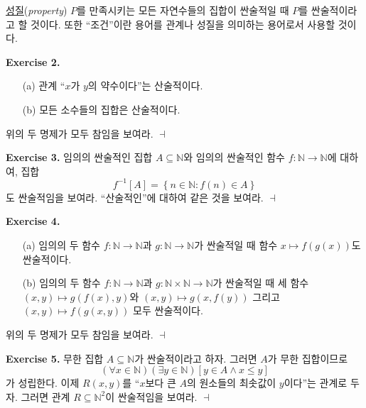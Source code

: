 \documentclass[12pt]{paper}
\newenvironment{context}[1][]{\noindent \textbf{{#1}.}}{\hfill $ \dashv $}
\begin{document}
  \underline{성질}(\textit{property}) $P$를 만족시키는 모든 자연수들의 집합이 싼술적일 때 $P$를 싼술적이라고 할 것이다.
  또한 ``조건''이란 용어를 관계나 성질을 의미하는 용어로서 사용할 것이다.

  \begin{context}[Exercise 2]
    \begin{enumerate}
      \item[(a)] 관계 ``$x$가 $y$의 약수이다''는 산술적이다.
      \item[(b)] 모든 소수들의 집합은 산술적이다.
    \end{enumerate}

    위의 두 명제가 모두 참임을 보여라.
  \end{context}

  \begin{context}[Exercise 3]
    임의의 싼술적인 집합 $A \subseteq \mathbb{N}$와 임의의 싼술적인 함수 $f : \mathbb{N} \to \mathbb{N}$에 대하여, 집합 $$f^{-1} \left[ A \right] = \left\{ n \in \mathbb{N} : f \left( n \right) \in A \right\}$$도 싼술적임을 보여라.
    ``산술적인''에 대하여 같은 것을 보여라.
  \end{context}

  \begin{context}[Exercise 4]
    \begin{enumerate}
      \item[(a)] 임의의 두 함수 $f : \mathbb{N} \to \mathbb{N}$과 $g : \mathbb{N} \to \mathbb{N}$가 싼술적일 때
      함수 $x \mapsto f \left( g \left( x \right) \right)$도 싼술적이다.
      \item[(b)] 임의의 두 함수 $f : \mathbb{N} \to \mathbb{N}$과 $g : \mathbb{N} \times \mathbb{N} \to \mathbb{N}$가 싼술적일 때
      세 함수 $ \left( x , y \right) \mapsto g \left( f \left( x \right) , y \right) $와 $ \left( x , y \right) \mapsto g \left( x , f \left( y \right) \right) $ 그리고 $ \left( x , y \right) \mapsto f \left( g \left( x , y \right) \right) $ 모두 싼술적이다.
    \end{enumerate}

    위의 두 명제가 모두 참임을 보여라.
  \end{context}

  \begin{context}[Exercise 5]
    무한 집합 $A \subseteq \mathbb{N}$가 싼술적이라고 하자.
    그러면 $A$가 무한 집합이므로 $$\left( \forall x \in \mathbb{N} \right) \left( \exists y \in \mathbb{N} \right) \left[ y \in A \land x \leq y \right]$$가 성립한다.
    이제 $R \left( x , y \right)$를 ``$x$보다 큰 $A$의 원소들의 최솟값이 $y$이다''는 관계로 두자.
    그러면 관계 $R \subseteq \mathbb{N}^{2}$이 싼술적임을 보여라.
  \end{context}
\end{document}
